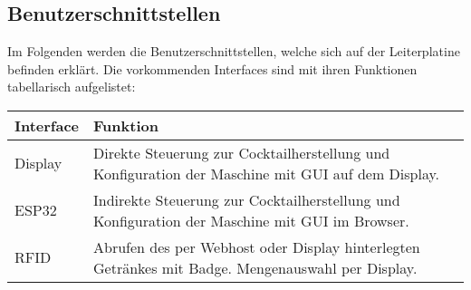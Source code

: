 \clearpage
\subsection{Benutzerschnittstellen}
\label{subsec:Benutzerschnittstellen}

Im Folgenden werden die Benutzerschnittstellen, welche sich auf der Leiterplatine befinden erklärt. Die vorkommenden Interfaces sind mit ihren Funktionen tabellarisch aufgelistet:

\begin{tabularx}{\textwidth}{|l|X|}
\hline
\textbf{Interface} & \textbf{Funktion}\\
\hline
Display & Direkte Steuerung zur Cocktailherstellung und Konfiguration der Maschine mit GUI auf dem Display. \\
\hline
ESP32 & Indirekte Steuerung zur Cocktailherstellung und Konfiguration der Maschine mit GUI im Browser.\\
\hline
RFID & Abrufen des per Webhost oder Display hinterlegten Getränkes mit Badge. Mengenauswahl per Display.\\
\hline
\end{tabularx}